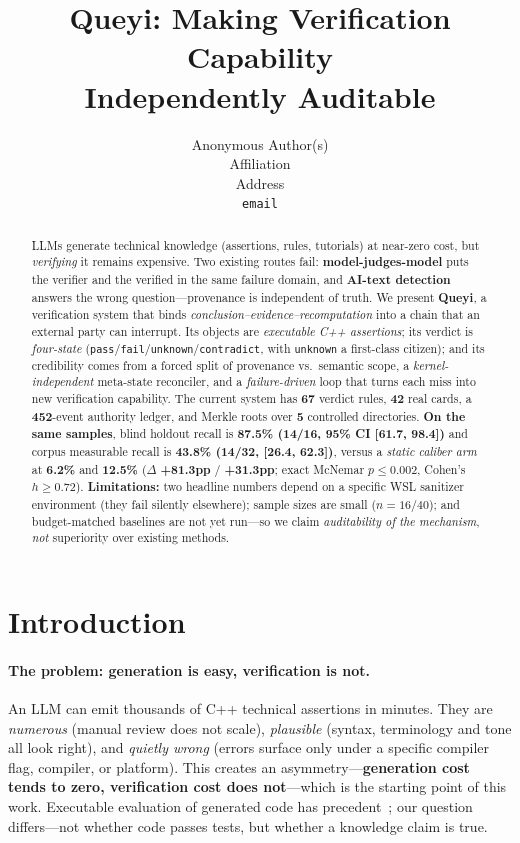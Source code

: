 \documentclass{article}
\title{Queyi: Making Verification Capability\\ Independently Auditable}
\author{%
  Anonymous Author(s) \\
  Affiliation \\
  Address \\
  \texttt{email} \\
}
\begin{document}
\maketitle

\begin{abstract}
LLMs generate technical knowledge (assertions, rules, tutorials) at near-zero cost,
but \emph{verifying} it remains expensive. Two existing routes fail: \textbf{model-judges-model}
puts the verifier and the verified in the same failure domain, and \textbf{AI-text detection}
answers the wrong question---provenance is independent of truth. We present \textbf{Queyi}, a
verification system that binds \emph{conclusion--evidence--recomputation} into a chain that an
external party can interrupt. Its objects are \emph{executable C++ assertions}; its verdict is
\emph{four-state} (\texttt{pass}/\texttt{fail}/\texttt{unknown}/\texttt{contradict}, with
\texttt{unknown} a first-class citizen); and its credibility comes from a forced split of
provenance vs.\ semantic scope, a \emph{kernel-independent} meta-state reconciler, and a
\emph{failure-driven} loop that turns each miss into new verification capability. The current
system has \textbf{67} verdict rules, \textbf{42} real cards, a \textbf{452}-event authority
ledger, and Merkle roots over \textbf{5} controlled directories. \textbf{On the same samples}, blind
holdout recall is \textbf{87.5\% (14/16, 95\% CI [61.7, 98.4])} and corpus measurable recall is
\textbf{43.8\% (14/32, [26.4, 62.3])}, versus a \emph{static caliber arm} at \textbf{6.2\%} and
\textbf{12.5\%} ($\Delta$ \textbf{+81.3pp} / \textbf{+31.3pp}; exact McNemar $p\le0.002$, Cohen's
$h\ge0.72$). \textbf{Limitations:} two headline numbers depend on a
specific WSL sanitizer environment (they fail silently elsewhere); sample sizes are small
($n{=}16/40$); and budget-matched baselines are not yet run---so we claim
\emph{auditability of the mechanism}, \emph{not} superiority over existing methods.
\end{abstract}

\section{Introduction}
\label{sec:intro}
\paragraph{The problem: generation is easy, verification is not.}
An LLM can emit thousands of C++ technical assertions in minutes. They are \emph{numerous}
(manual review does not scale), \emph{plausible} (syntax, terminology and tone all look right),
and \emph{quietly wrong} (errors surface only under a specific compiler flag, compiler, or
platform). This creates an asymmetry---\textbf{generation cost tends to zero, verification cost
does not}---which is the starting point of this work. Executable evaluation of generated code has
precedent~\cite{chen2021humaneval}; our question differs---not whether code passes tests, but
whether a knowledge claim is true.
\end{document}

